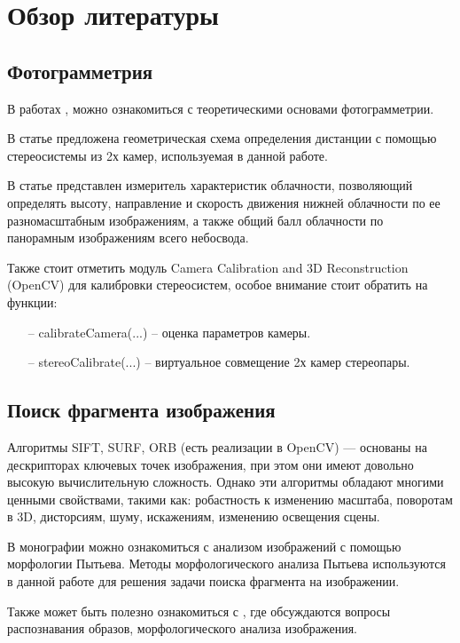 \section*{Обзор литературы}

\subsection*{Фотограмметрия}

В работах
\cite{book:hartley_geometry},
\cite{book:forsyth_geometry}
можно ознакомиться с теоретическими основами фотограмметрии.

В статье
\cite{article:stereo}
предложена геометрическая схема определения дистанции с помощью стереосистемы из 2х камер,
используемая в данной работе.

В статье
\cite{art:zuev} представлен измеритель характеристик облачности, позволяющий определять
высоту, направление и скорость движения нижней облачности по ее разномасштабным изображениям,
а также общий балл облачности по панорамным изображениям всего небосвода.


Также стоит отметить модуль Camera Calibration and 3D Reconstruction (OpenCV)
для калибровки стереосистем, особое внимание стоит обратить на функции:
\begin{itemize}
  \item[--] calibrateCamera(...) -- оценка параметров камеры.
  \item[--] stereoCalibrate(...) -- виртуальное совмещение 2х камер стереопары.
\end{itemize}


\subsection*{Поиск фрагмента изображения}
Алгоритмы SIFT, SURF, ORB (есть реализации в OpenCV)
--- основаны на дескрипторах ключевых точек изображения, при этом они имеют
довольно высокую вычислительную сложность.
Однако эти алгоритмы обладают многими ценными свойствами, такими как:
робастность к изменению масштаба, поворотам в 3D, дисторсиям, шуму,
искажениям, изменению освещения сцены.

В монографии \cite{book:morpho} можно ознакомиться с анализом изображений с помощью морфологии Пытьева.
Методы морфологического анализа Пытьева используются в данной работе для решения задачи
поиска фрагмента на изображении.

Также может быть полезно ознакомиться с
\cite{book:gonsalez}, где обсуждаются вопросы распознавания образов, морфологического анализа изображения.